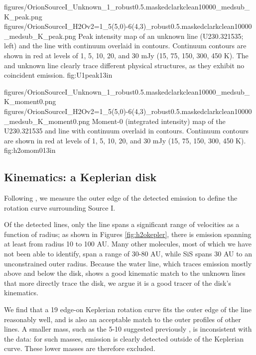 \documentclass[twocolumn]{aastex61}
\begin{document}
\FigureTwo
{{figures/OrionSourceI_Unknown_1_robust0.5.maskedclarkclean10000_medsub_K_peak}.png}
{{figures/OrionSourceI_H2Ov2=1_5(5,0)-6(4,3)_robust0.5.maskedclarkclean10000_medsub_K_peak}.png}
{Peak intensity map of an unknown line (U230.321535; left) and the \water
line with continuum overlaid
in contours.  Continuum contours are shown in red at levels of 1, 5, 10, 20, and 30
mJy \perbeam (15, 75, 150, 300, 450 K).
The \water and unknown line clearly trace different physical structures, as
they exhibit no coincident emission.
}
{fig:U1peak}{1}{3in}

\FigureTwo
{{figures/OrionSourceI_Unknown_1_robust0.5.maskedclarkclean10000_medsub_K_moment0}.png}
{{figures/OrionSourceI_H2Ov2=1_5(5,0)-6(4,3)_robust0.5.maskedclarkclean10000_medsub_K_moment0}.png}
{Moment-0 (integrated intensity) map of the U230.321535 and \water line with continuum overlaid
in contours.  Continuum contours are shown in red at levels of 1, 5, 10, 20, and 30
mJy \perbeam (15, 75, 150, 300, 450 K).
}
{fig:h2omom0}{1}{3in}

\subsection{Kinematics: a Keplerian disk}
Following \citet{Seifried2016a}, we measure the outer edge of the detected
emission to define the rotation curve surrounding Source I.

Of the detected lines, only the \water line spans a significant range of
velocities as a function of radius; as shown in Figures \ref{fig:h2okepler},
there is \water emission spanning at least from radius 10 to 100 AU.  Many
other molecules, most of
which we have not been able to identify, span a range of 30-80 AU, while SiS
spans 30 AU to an unconstrained outer radius.  Because the water line,
which traces emission mostly above and below the disk, shows a good kinematic
match to the unknown lines that more directly trace the disk, we argue it is
a good tracer of the disk's kinematics.

We find that a 19 \msun edge-on Keplerian rotation curve fits the outer edge of
the \water line reasonably well, and is also an acceptable match to the outer
profiles of other lines.  A smaller mass, such as the 5-10 \msun suggested
previously \citep{Plambeck2016a,Hirota2014a}, is inconsistent with the data:
for such masses, emission is clearly detected outside of the Keplerian curve.
These lower masses are therefore excluded.  
\end{document}
